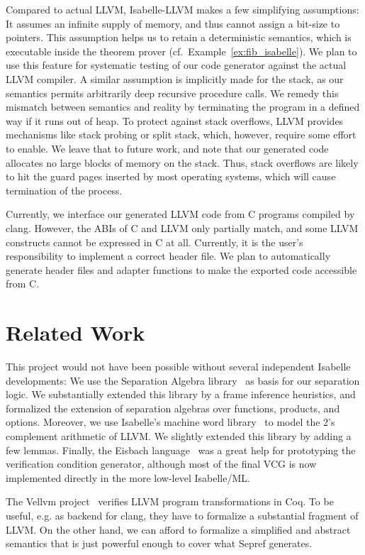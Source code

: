 \documentclass[a4paper,USenglish,cleveref, autoref]{lipics-v2019}
\begin{document}
Compared to actual LLVM, Isabelle-LLVM makes a few simplifying assumptions: It assumes an infinite supply of memory, and thus cannot assign a bit-size to pointers. 
This assumption helps us to retain a deterministic semantics, which is executable inside the theorem prover (cf.~Example~\ref{ex:fib_isabelle}). 
We plan to use this feature for systematic testing of our code generator against the actual LLVM compiler. 
A similar assumption is implicitly made for the stack, as our semantics permits arbitrarily deep recursive procedure calls.
We remedy this mismatch between semantics and reality by terminating the program in a defined way if it runs out of heap.
To protect against stack overflows, LLVM provides mechanisms like stack probing or split stack, which, however, require some effort to enable. 
We leave that to future work, and note that our generated code allocates no large blocks of memory on the stack. 
Thus, stack overflows are likely to hit the guard pages inserted by most operating systems, which will cause termination of the process.

Currently, we interface our generated LLVM code from C programs compiled by clang. However, the ABIs of C and LLVM only partially match, 
and some LLVM constructs cannot be expressed in C at all.
Currently, it is the user's responsibility to implement a correct header file. 
We plan to automatically generate header files and adapter functions to make the exported code accessible from C.


\section{Related Work}\label{sec:related_work}
This project would not have been possible without several independent Isabelle developments:
We use the Separation Algebra library~\cite{KKB12_afp,KKB12} as basis for our separation logic. We substantially extended this library by a 
frame inference heuristics, and formalized the extension of separation algebras over functions, products, and options. 
Moreover, we use Isabelle's machine word library~\cite{Word_Lib-AFP} to model the 2's complement arithmetic of LLVM. We slightly extended this library by adding a few lemmas. Finally, the Eisbach language~\cite{MMW16} was a great help for prototyping the verification condition generator, although most of the 
final VCG is now implemented directly in the more low-level Isabelle/ML.

The Vellvm project~\cite{ZNMZ12,ZNMZ13} verifies LLVM program transformations in Coq.
To be useful, e.g. as backend for clang, they have to formalize a substantial fragment of LLVM. 
On the other hand, we can afford to formalize a simplified and abstract semantics that 
is just powerful enough to cover what Sepref generates.
\end{document}
